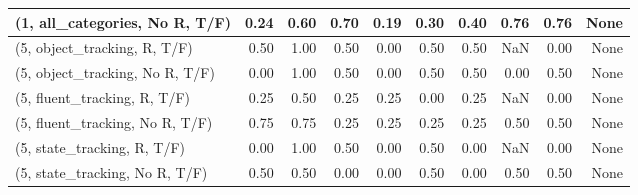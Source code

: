 \begin{table*}[h!]
\begin{adjustbox}{width=2\columnwidth,center}
\begin{tabular}{lrrr|rrr|rrr}
(1, all\_categories, No R, T/F)       &                      0.24 &                  0.60 &                      0.70 &                          0.19 &                      0.30 &                          0.40 &                                   0.76 &                               0.76 &                                  None \\



\midrule
(5, object\_tracking, R, T/F)         &                      0.50 &                  1.00 &                      0.50 &                          0.00 &                      0.50 &                          0.50 &                                    NaN &                               0.00 &                                  None \\
(5, object\_tracking, No R, T/F)      &                      0.00 &                  1.00 &                      0.50 &                          0.00 &                      0.50 &                          0.50 &                                   0.00 &                               0.50 &                                  None \\
(5, fluent\_tracking, R, T/F)         &                      0.25 &                  0.50 &                      0.25 &                          0.25 &                      0.00 &                          0.25 &                                    NaN &                               0.00 &                                  None \\
(5, fluent\_tracking, No R, T/F)      &                      0.75 &                  0.75 &                      0.25 &                          0.25 &                      0.25 &                          0.25 &                                   0.50 &                               0.50 &                                  None \\
(5, state\_tracking, R, T/F)          &                      0.00 &                  1.00 &                      0.50 &                          0.00 &                      0.50 &                          0.00 &                                    NaN &                               0.00 &                                  None \\
(5, state\_tracking, No R, T/F)       &                      0.50 &                  0.50 &                      0.00 &                          0.00 &                      0.50 &                          0.00 &                                   0.50 &                               0.50 &                                  None \\

\end{tabular}
\end{adjustbox}
\end{table*}
